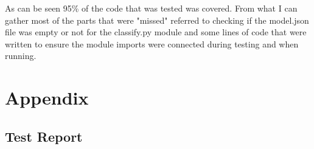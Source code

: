 \documentclass[12pt, titlepage]{article}
\begin{document}
As can be seen 95\% of the code that was tested was covered. From what I can gather most of the parts that were
"missed" referred to checking if the model.json file was empty or not for the classify.py module and some lines of code
that were written to ensure the module imports were connected during testing and when running.

\newpage





\newpage

\section{Appendix}
\subsection{Test Report} \label{test_report}
\end{document}
